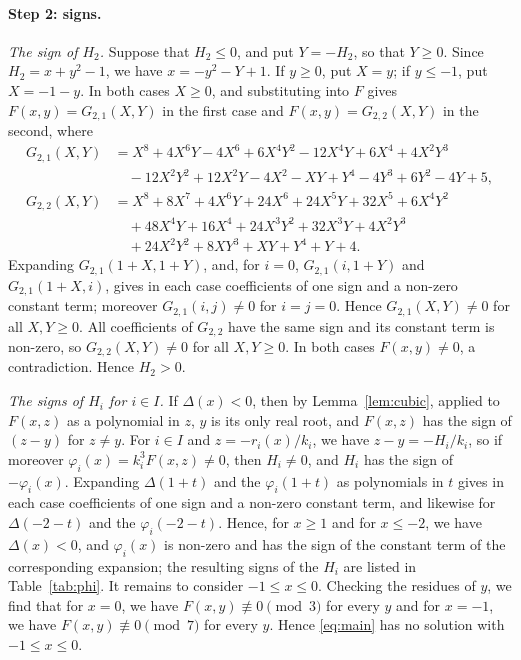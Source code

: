 \documentclass[11pt]{article}
\begin{document}
\paragraph{Step 2: signs.} \emph{The sign of $H_{2}$.} Suppose that $H_{2}\leq0$, and put $Y=-H_{2}$, so that $Y\geq0$. Since $H_{2}=x+y^{2}-1$, we have $x=-y^{2}-Y+1$. If $y\geq0$, put $X=y$; if $y\leq-1$, put $X=-1-y$. In both cases $X\geq0$, and substituting into $F$ gives $F(x,y)=G_{2,1}(X,Y)$ in the first case and $F(x,y)=G_{2,2}(X,Y)$ in the second, where
\begin{align*}
G_{2,1}(X,Y)&=X^{8}+4X^{6}Y-4X^{6}+6X^{4}Y^{2}-12X^{4}Y+6X^{4}+4X^{2}Y^{3}\\
&\quad-12X^{2}Y^{2}+12X^{2}Y-4X^{2}-XY+Y^{4}-4Y^{3}+6Y^{2}-4Y+5,\\
G_{2,2}(X,Y)&=X^{8}+8X^{7}+4X^{6}Y+24X^{6}+24X^{5}Y+32X^{5}+6X^{4}Y^{2}\\
&\quad+48X^{4}Y+16X^{4}+24X^{3}Y^{2}+32X^{3}Y+4X^{2}Y^{3}\\
&\quad+24X^{2}Y^{2}+8XY^{3}+XY+Y^{4}+Y+4.
\end{align*}
Expanding $G_{2,1}(1+X,1+Y)$, and, for $i=0$, $G_{2,1}(i,1+Y)$ and $G_{2,1}(1+X,i)$, gives in each case coefficients of one sign and a non-zero constant term; moreover $G_{2,1}(i,j)\neq0$ for $i=j=0$. Hence $G_{2,1}(X,Y)\neq0$ for all $X,Y\geq0$. All coefficients of $G_{2,2}$ have the same sign and its constant term is non-zero, so $G_{2,2}(X,Y)\neq0$ for all $X,Y\geq0$. In both cases $F(x,y)\neq0$, a contradiction. Hence $H_{2}>0$.

\emph{The signs of $H_i$ for $i\in I$.} If $\Delta(x)<0$, then by Lemma~\ref{lem:cubic}, applied to $F(x,z)$ as a polynomial in $z$, $y$ is its only real root, and $F(x,z)$ has the sign of $(z-y)$ for $z\neq y$. For $i\in I$ and $z=-r_i(x)/k_i$, we have $z-y=-H_i/k_i$, so if moreover $\varphi_i(x)=k_i^3F(x,z)\neq0$, then $H_i\neq0$, and $H_i$ has the sign of $-\varphi_i(x)$. Expanding $\Delta(1+t)$ and the $\varphi_i(1+t)$ as polynomials in $t$ gives in each case coefficients of one sign and a non-zero constant term, and likewise for $\Delta(-2-t)$ and the $\varphi_i(-2-t)$. Hence, for $x\geq1$ and for $x\leq-2$, we have $\Delta(x)<0$, and $\varphi_i(x)$ is non-zero and has the sign of the constant term of the corresponding expansion; the resulting signs of the $H_i$ are listed in Table~\ref{tab:phi}. It remains to consider $-1\leq x\leq0$. Checking the residues of $y$, we find that for $x=0$, we have $F(x,y)\not\equiv0\pmod{3}$ for every $y$ and for $x=-1$, we have $F(x,y)\not\equiv0\pmod{7}$ for every $y$. Hence \eqref{eq:main} has no solution with $-1\leq x\leq0$.
\end{document}
